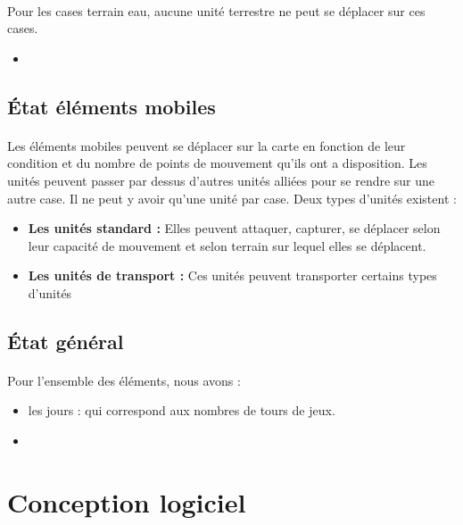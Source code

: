 \documentclass[12pt]{report}
\begin{document}
\paragraph{}Pour les cases terrain eau, aucune unité terrestre ne peut se déplacer sur ces cases.
\begin{itemize}
    \item 
\end{itemize}
\subsection{État éléments mobiles}
\paragraph{}Les éléments mobiles peuvent se déplacer sur la carte en fonction de leur condition et du nombre de points de mouvement qu'ils ont a disposition. Les unités peuvent passer par dessus d'autres unités alliées pour se rendre sur une autre case. Il ne peut y avoir qu'une unité par case. Deux types d'unités existent : 
\begin{itemize}
    \item \textbf{Les unités standard :} Elles peuvent attaquer, capturer, se déplacer selon leur capacité de mouvement et selon terrain sur lequel elles se déplacent.
    \item \textbf{Les unités de transport :} Ces unités peuvent transporter certains types d'unités
\end{itemize}

\subsection{État général}
\paragraph{}Pour l'ensemble des éléments, nous avons :
\begin{itemize}
    \item les jours : qui correspond aux nombres de tours de jeux.
    \item 
\end{itemize}
\section{Conception logiciel}
\end{document}
